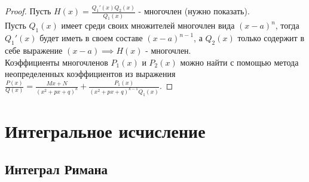 \documentclass{report}
\theoremstyle{definition}
\begin{document}
\begin{proof}
  Пусть $H(x) = \frac{Q_{1}'(x)Q_{2}(x)}{Q_{1}(x)}$ - многочлен (нужно показать).\\

  Пусть $Q_{1}(x)$ имеет среди своих множителей многочлен вида $(x-a)^{n}$, тогда $Q_{1}'(x)$ будет иметь в своем
  составе $(x-a)^{n-1}$, а $Q_{2}(x)$ только содержит в себе выражение $(x-a) \implies H(x)$ - многочлен.\\

  Коэффициенты многочленов $P_{1}(x)$ и $P_{2}(x)$ можно найти с помощью метода неопределенных коэффициентов
  из выражения $\frac{P(x)}{Q(x)} = \frac{Mx + N}{(x^{2} + px + q)^{k}} + \frac{P_{1}(x)}{(x^{2} + px + q)^{k-1}Q_{1}(x)}$.
\end{proof}

\chapter{Интегральное исчисление}

\section*{Интеграл Римана}
\end{document}
